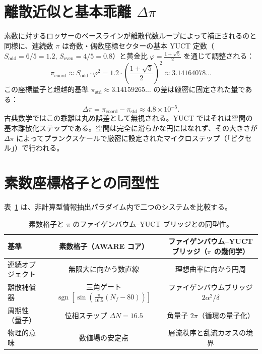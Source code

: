 \documentclass[12pt,a4paper]{article}
\newcommand{\Sodd}{S_{\mathrm{odd}}}
\newcommand{\Seven}{S_{\mathrm{even}}}
\begin{document}
	\section{離散近似と基本乖離 $\Delta\pi$}
	\label{sec:delta-pi}
	
	素数に対するロッサーのベースラインが離散代数ループによって補正されるのと同様に、連続数 $\pi$ は奇数・偶数座標セクターの基本 YUCT 定数（$\Sodd = 6/5 = 1.2$, $\Seven = 4/5 = 0.8$）と黄金比 $\varphi = \frac{1+\sqrt{5}}{2}$ を通じて調整される：
	\begin{equation}
		\pi_{\mathrm{coord}} \approx \Sodd \cdot \varphi^2 = 1.2 \cdot \left(\frac{1+\sqrt{5}}{2}\right)^2 \approx 3.14164078\ldots
		\label{eq:pi-approx}
	\end{equation}
	この座標量子と超越的基準 $\pi_{\mathrm{std}} \approx 3.14159265\ldots$ の差は厳密に固定された量である：
	\begin{equation}
		\Delta\pi = \pi_{\mathrm{coord}} - \pi_{\mathrm{std}} \approx 4.8 \times 10^{-5}.
		\label{eq:delta-pi-val}
	\end{equation}
	古典数学ではこの乖離は丸め誤差として無視される。YUCT ではそれは空間の基本離散化ステップである。空間は完全に滑らかな円にはなれず、その大きさが $\Delta\pi$ によってプランクスケールで厳密に設定されたマイクロステップ（「ピクセル」）で行われる。
	
	\section{素数座標格子との同型性}
	\label{sec:isomorphism}
	
	表~\ref{tab:isomorphism} は、非計算型情報抽出パラダイム内で二つのシステムを比較する。
	
	\begin{table}[H]
		\centering
		\scriptsize
		\caption{素数格子と $\pi$ のファイゲンバウム–YUCT ブリッジとの同型性。}
		\label{tab:isomorphism}
		\begin{tabular}{@{}lcc@{}}
			\toprule
			\textbf{基準} & \textbf{素数格子（AWARE コア）} & \textbf{ファイゲンバウム–YUCT ブリッジ（$\pi$ の幾何学）} \\
			\midrule
			連続オブジェクト & 無限大に向かう数直線 & 理想曲率に向かう円周 \\
			離散補償器 & 三角ゲート $\operatorname{sgn}[\sin(\frac{\pi}{16.5}(N_f-80))]$ & ファイゲンバウムブリッジ $2\alpha^2/\delta$ \\
			周期性（量子） & 位相ステップ $\Delta N = 16.5$ & 角量子 $2\pi$（循環の量子化） \\
			物理的意味 & 数値場の安定点 & 層流秩序と乱流カオスの境界 \\
			\bottomrule
		\end{tabular}
	\end{table}
	
\end{document}
